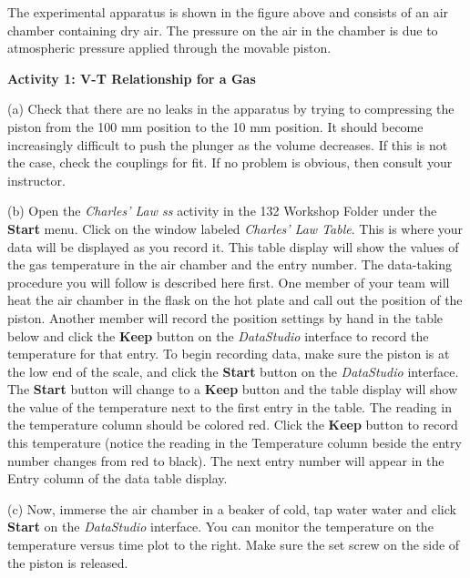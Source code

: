 The experimental apparatus is shown in the figure above and consists
of an air chamber containing dry air. The pressure on the air in the chamber is due to atmospheric
pressure applied through the movable piston.

\textbf{Activity 1: V-T Relationship for a Gas} \nopagebreak

(a) Check that there are no leaks in the apparatus by trying to compressing
the piston from the 100 mm position to the 10 mm position. It should become
increasingly difficult to push the plunger as the volume decreases. If this
is not the case, check the couplings for fit. If no problem is obvious, then
consult your instructor. 

(b) Open the {\it Charles' Law ss} activity in the 132 Workshop Folder under the
{\bf Start} menu.
Click on the window labeled \textit{Charles' Law Table}. 
This is where your data will be displayed as you record
it. This table display will show the values of the gas temperature in the air chamber
and the entry number.
The data-taking procedure you will follow is described here first.
One member of your team will heat the air chamber in the flask on the hot plate 
and call out the position of the piston.
Another member will record the position settings by hand in the table below
and
click the {\bf Keep} button on the {\it DataStudio} interface to record the 
temperature for that entry.
To begin recording data, make sure the piston is at the low end of the scale, and click
the {\bf Start} button on the {\it DataStudio} interface. 
The {\bf Start} button will change to a {\bf Keep} button and the table
display will show the value of the temperature next to the first entry in the table. 
The reading in the temperature column should be colored red.
Click the {\bf Keep} button to record this temperature (notice the reading in the Temperature
column beside the entry number changes from red to black). The next entry number
 will appear in the Entry column of the data table display.


(c) Now, immerse the air chamber in a beaker of cold, tap water water and click
{\bf Start} on the {\it DataStudio} interface. You can monitor the temperature
on the temperature versus time plot to the right.
Make sure the set screw on the side of the piston is released.

